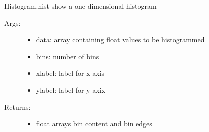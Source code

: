 \documentclass[letterpaper,10pt,english]{sphinxmanual}
\begin{document}
\begin{fulllineitems}
\label{\detokenize{index:PhyPraKit.PhyPraKit.nhist}}
Histogram.hist
show a one-dimensional histogram
\begin{description}
\item[{Args:}] \leavevmode\begin{itemize}
\item {} 
data: array containing float values to be histogrammed

\item {} 
bins: number of bins

\item {} 
xlabel: label for x-axis

\item {} 
ylabel: label for y axix

\end{itemize}

\item[{Returns:}] \leavevmode\begin{itemize}
\item {} 
float arrays bin content and bin edges

\end{itemize}

\end{description}

\end{fulllineitems}

\end{document}
